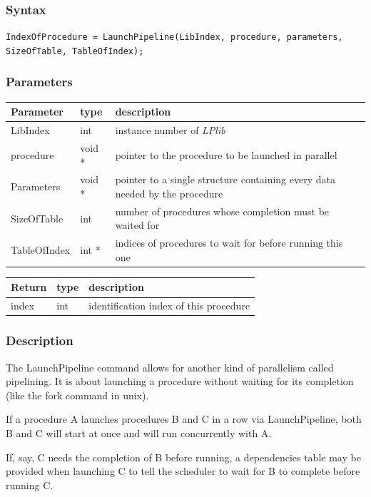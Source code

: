 \documentclass[a4paper,12pt]{article}
\begin{document}
\subsubsection*{Syntax}
\tt{IndexOfProcedure = LaunchPipeline(LibIndex, procedure, parameters, SizeOfTable, TableOfIndex);}
\normalfont

\subsubsection*{Parameters}
\begin{tabular}{|m{3cm}|m{1.5cm}|m{10.5cm}|}
\hline
Parameter    & type   & description \\
\hline
LibIndex     & int    & instance number of \emph{LPlib} \\
\hline
procedure    & void * & pointer to the procedure to be launched in parallel \\
\hline
Parameters   & void * & pointer to a single structure containing every data needed by the procedure \\
\hline
SizeOfTable  & int    & number of procedures whose completion must be waited for \\
\hline
TableOfIndex & int *  & indices of procedures to wait for before running this one \\
\hline
\end{tabular}

\medskip

\noindent
\begin{tabular}{|m{3cm}|m{1.5cm}|m{10.5cm}|}
\hline
Return       & type   & description \\
\hline
index        & int    & identification index of this procedure \\
\hline
\end{tabular}

\subsubsection*{Description}
The LaunchPipeline command allows for another kind of parallelism called pipelining. It is about launching a procedure without waiting for its completion (like the fork command in unix).

If a procedure A launches procedures B and C in a row via LaunchPipeline, both B and C will start at once and will run concurrently with A.

If, say, C needs the completion of B before running, a dependencies table may be provided when launching C to tell the scheduler to wait for B to complete before running C.
\end{document}
